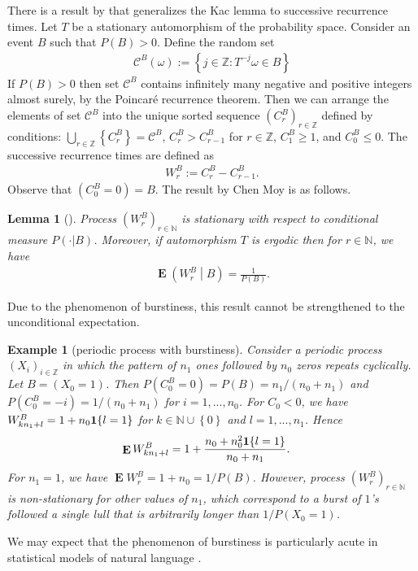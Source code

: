 \documentclass[a4paper,12pt]{article}
\newcommand{\okra}[1]{\left( #1 \right)}
\newcommand{\klam}[1]{\left\{ #1 \right\}}
\DeclareMathOperator{\mean}{\mathbf{E}}
\newcommand{\boole}[1]{{\bf 1}{\klam{#1}}}
\newtheorem{example}{Example}
\newtheorem{lemma}{Lemma}
\begin{document}
There is a result by \citeauthor{ChenMoy59} that generalizes the Kac
lemma to successive recurrence times.  Let $T$ be a stationary
automorphism of the probability space.  Consider an event $B$ such
that $P(B)>0$. Define the random set
\begin{align}
  \mathcal{C}^B(\omega):=\klam{j\in\mathbb{Z}: T^{-j}\omega\in B}
\end{align}
If $P(B)>0$ then set $\mathcal{C}^B$ contains infinitely many negative
and positive integers almost surely, by the Poincar\'e recurrence
theorem. Then we can arrange the elements of set $\mathcal{C}^B$ into
the unique sorted sequence $(C^B_r)_{r\in\mathbb{Z}}$ defined by
conditions: $\bigcup_{r\in\mathbb{Z}}\klam{C^B_r}=\mathcal{C}^B$,
$C^B_r>C^B_{r-1}$ for $r\in\mathbb{Z}$, $C^B_1\ge 1$, and
$C^B_0\le 0$.  The successive recurrence times are defined as
\begin{align}
  \label{Successive}
  W^B_r:=C^B_r-C^B_{r-1}.
\end{align}
Observe that $(C^B_0=0)=B$. The result by Chen Moy is as follows.
\begin{lemma}[\citep{ChenMoy59}]
  \label{theoChenMoy}
  Process $(W^B_r)_{r\in\mathbb{N}}$ is stationary with respect to
  conditional measure $P(\cdot|B)$. Moreover, if automorphism $T$
  is ergodic then for $r\in\mathbb{N}$, we have
  \begin{align}
    \mean\okra{W^B_r\middle|B}
    =
    \frac{1}{P(B)}.
  \end{align}
\end{lemma}

Due to the phenomenon of burstiness, this result cannot be
strengthened to the unconditional expectation.
\begin{example}[periodic process with burstiness]
  Consider a periodic process $(X_i)_{i\in\mathbb{Z}}$ in which the
  pattern of $n_1$ ones followed by $n_0$ zeros repeats
  cyclically. Let $B=(X_0=1)$. Then $P(C^B_0=0)=P(B)=n_1/(n_0+n_1)$
  and $P(C^B_0=-i)=1/(n_0+n_1)$ for $i=1,...,n_0$. For $C_0<0$, we
  have $W^B_{kn_1+l}=1+n_0\boole{l=1}$ for
  $k\in\mathbb{N}\cup\klam{0}$ and $l=1,...,n_1$. Hence
\begin{align}
  \mean W^B_{kn_1+l}&=1+\frac{n_0+n_0^2\boole{l=1}}{n_0+n_1}.
\end{align}
For $n_1=1$, we have $\mean W^B_r=1+n_0=1/P(B)$. However, process
$(W^B_r)_{r\in\mathbb{N}}$ is non-stationary for other values of
$n_1$, which correspond to a burst of $1$'s followed a single lull
that is arbitrarily longer than $1/P(X_0=1)$.
\end{example}
We may expect that the phenomenon of burstiness is particularly acute
in statistical models of natural language
\citep{Katz96,AltmannPierrehumbertMotter09,Debowski15f}.
\end{document}
